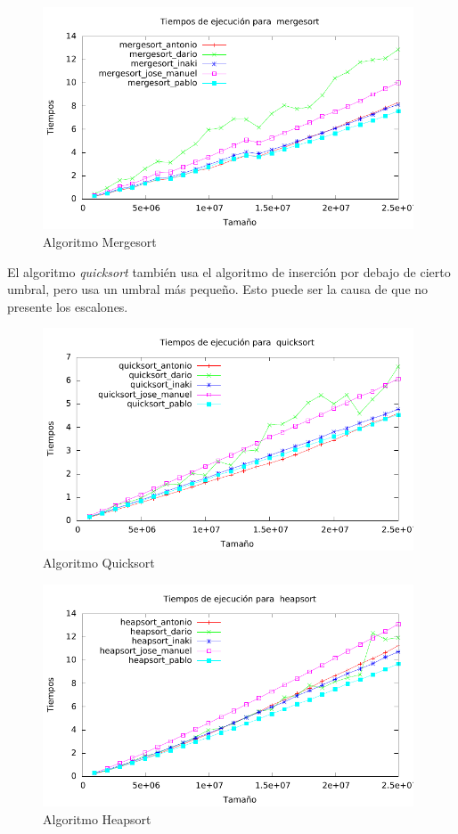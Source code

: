 \documentclass[a4paper, 11pt]{article}
\begin{document}
\begin{figure}[h] \includegraphics[width=11cm]{mergesort_todos_g} \centering
 \caption{Algoritmo Mergesort} \end{figure}

El algoritmo \textit{quicksort} también usa el algoritmo de inserción por debajo de cierto umbral, pero usa un umbral más pequeño. Esto puede ser la causa de que no presente los escalones.

\begin{figure}[h] \includegraphics[width=11cm]{quicksort_todos_g} \centering
 \caption{Algoritmo Quicksort} \end{figure}

 \begin{figure}[h] \includegraphics[width=11cm]{heapsort_todos_g} \centering
  \caption{Algoritmo Heapsort} \end{figure}
\end{document}
